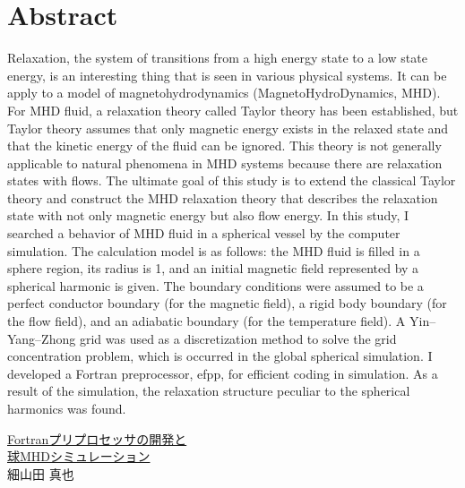 \documentclass[12pt]{jsarticle}
\begin{document}
\section*{Abstract}
Relaxation, the system of transitions from a high energy state to a low state energy, is an interesting thing that is seen in various physical systems. It can be apply to a model of magnetohydrodynamics (MagnetoHydroDynamics, MHD). For MHD fluid, a relaxation theory called Taylor theory has been established, but Taylor theory assumes that only magnetic energy exists in the relaxed state and that the kinetic energy of the fluid can be ignored. This theory is not generally applicable to natural phenomena in MHD systems because there are relaxation states with flows. The ultimate goal of this study is to extend the classical Taylor theory and construct the MHD relaxation theory that describes the relaxation state with not only magnetic energy but also flow energy. In this study, I searched a behavior of MHD fluid in a spherical vessel by the computer simulation. The calculation model is as follows: the MHD fluid is filled in a sphere region, its radius is 1, and an initial magnetic field represented by a spherical harmonic is given. The boundary conditions were assumed to be a perfect conductor boundary (for the magnetic field), a rigid body boundary (for the flow field), and an adiabatic boundary (for the temperature field). A Yin--Yang--Zhong grid was used as a discretization method to solve the grid concentration problem, which is occurred in the global spherical simulation. I developed a Fortran preprocessor, efpp, for efficient coding in simulation. As a result of the simulation, the relaxation structure peculiar to the spherical harmonics was found.


\newpage
\thispagestyle{empty}
\begin{center}
\Large{\underline{Fortranプリプロセッサの開発と}}\\
\Large{\underline{球MHDシミュレーション}}\\
\vspace{1.5cm}
\large{細山田 真也}
\end{center}
\vspace{1cm}
\end{document}

